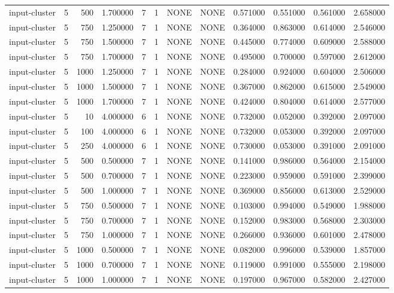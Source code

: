 \begin{tabular}{lrrrllllrrrr}
input-cluster & 5 & 500 & 1.700000 & 7 & 1 & NONE & NONE & 0.571000 & 0.551000 & 0.561000 & 2.658000 \\
input-cluster & 5 & 750 & 1.250000 & 7 & 1 & NONE & NONE & 0.364000 & 0.863000 & 0.614000 & 2.546000 \\
input-cluster & 5 & 750 & 1.500000 & 7 & 1 & NONE & NONE & 0.445000 & 0.774000 & 0.609000 & 2.588000 \\
input-cluster & 5 & 750 & 1.700000 & 7 & 1 & NONE & NONE & 0.495000 & 0.700000 & 0.597000 & 2.612000 \\
input-cluster & 5 & 1000 & 1.250000 & 7 & 1 & NONE & NONE & 0.284000 & 0.924000 & 0.604000 & 2.506000 \\
input-cluster & 5 & 1000 & 1.500000 & 7 & 1 & NONE & NONE & 0.367000 & 0.862000 & 0.615000 & 2.549000 \\
input-cluster & 5 & 1000 & 1.700000 & 7 & 1 & NONE & NONE & 0.424000 & 0.804000 & 0.614000 & 2.577000 \\
input-cluster & 5 & 10 & 4.000000 & 6 & 1 & NONE & NONE & 0.732000 & 0.052000 & 0.392000 & 2.097000 \\
input-cluster & 5 & 100 & 4.000000 & 6 & 1 & NONE & NONE & 0.732000 & 0.053000 & 0.392000 & 2.097000 \\
input-cluster & 5 & 250 & 4.000000 & 6 & 1 & NONE & NONE & 0.730000 & 0.053000 & 0.391000 & 2.091000 \\
input-cluster & 5 & 500 & 0.500000 & 7 & 1 & NONE & NONE & 0.141000 & 0.986000 & 0.564000 & 2.154000 \\
input-cluster & 5 & 500 & 0.700000 & 7 & 1 & NONE & NONE & 0.223000 & 0.959000 & 0.591000 & 2.399000 \\
input-cluster & 5 & 500 & 1.000000 & 7 & 1 & NONE & NONE & 0.369000 & 0.856000 & 0.613000 & 2.529000 \\
input-cluster & 5 & 750 & 0.500000 & 7 & 1 & NONE & NONE & 0.103000 & 0.994000 & 0.549000 & 1.988000 \\
input-cluster & 5 & 750 & 0.700000 & 7 & 1 & NONE & NONE & 0.152000 & 0.983000 & 0.568000 & 2.303000 \\
input-cluster & 5 & 750 & 1.000000 & 7 & 1 & NONE & NONE & 0.266000 & 0.936000 & 0.601000 & 2.478000 \\
input-cluster & 5 & 1000 & 0.500000 & 7 & 1 & NONE & NONE & 0.082000 & 0.996000 & 0.539000 & 1.857000 \\
input-cluster & 5 & 1000 & 0.700000 & 7 & 1 & NONE & NONE & 0.119000 & 0.991000 & 0.555000 & 2.198000 \\
input-cluster & 5 & 1000 & 1.000000 & 7 & 1 & NONE & NONE & 0.197000 & 0.967000 & 0.582000 & 2.427000 \\

\end{tabular}
